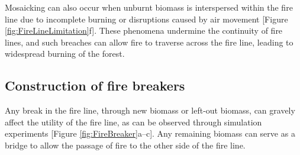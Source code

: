\documentclass[
  12 pt,
]{Nemilov}
\begin{document}
Mosaicking can also occur when unburnt biomass is interspersed within the fire line due to incomplete burning or disruptions caused by air movement {[}Figure \ref{fig:FireLineLimitation}f{]}. These phenomena undermine the continuity of fire lines, and such breaches can allow fire to traverse across the fire line, leading to widespread burning of the forest.

\subsection{Construction of fire breakers}\label{construction-of-fire-breakers}

Any break in the fire line, through new biomass or left-out biomass, can gravely affect the utility of the fire line, as can be observed through simulation experiments {[}Figure \ref{fig:FireBreaker}a--c{]}. Any remaining biomass can serve as a bridge to allow the passage of fire to the other side of the fire line.
\end{document}

